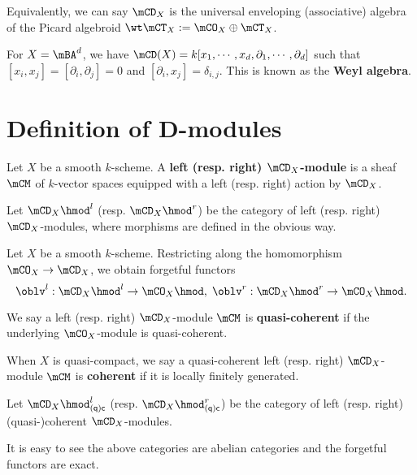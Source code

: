 	\begin{rem}
		Equivalently, we can say $\mCD_X$ is the universal enveloping (associative) algebra of the Picard algebroid $\wt\mCT_X:=\mCO_X \oplus \mCT_X$.

	\end{rem}

	\begin{exam}
		For $X=\mBA^d$, we have $\mCD(X) = k[x_1,\cdots,x_d, \partial_1,\cdots,\partial_d]$ such that $[x_i,x_j]=[\partial_i,\partial_j] =0$ and $[\partial_i,x_j]=\delta_{i,j}$. This is known as the \textbf{Weyl algebra}.
	\end{exam}

	

\section{Definition of D-modules}

	\begin{defn}
		Let $X$ be a smooth $k$-scheme. A \textbf{left (resp. right) $\mCD_X$-module} is a sheaf $\mCM$ of $k$-vector spaces equipped with a left (resp. right) action by $\mCD_X$.

		Let $\mCD_X\hmod^l$ (resp. $\mCD_X\hmod^r$) be the category of left (resp. right) $\mCD_X$-modules, where morphisms are defined in the obvious way.
	\end{defn}

	\begin{constr}
		Let $X$ be a smooth $k$-scheme. Restricting along the homomorphism $\mCO_X \to \mCD_X$, we obtain forgetful functors
		\[
			\oblv^l: \mCD_X\hmod^l\to \mCO_X\hmod,\; \oblv^r: \mCD_X\hmod^r\to \mCO_X\hmod.
		\]
		
	\end{constr}

	\begin{defn}
		We say a left (resp. right) $\mCD_X$-module $\mCM$ is \textbf{quasi-coherent} if the underlying $\mCO_X$-module is quasi-coherent.

		When $X$ is quasi-compact, we say a quasi-coherent left (resp. right) $\mCD_X$-module $\mCM$ is \textbf{coherent} if it is locally finitely generated.

		Let $\mCD_X\hmod_{\mathsf{(q)c}}^l$ (resp. $\mCD_X\hmod_{\mathsf{(q)c}}^r$) be the category of left (resp. right) (quasi-)coherent $\mCD_X$-modules.

	\end{defn}

	\begin{rem}
		It is easy to see the above categories are abelian categories and the forgetful functors are exact.
	\end{rem}

